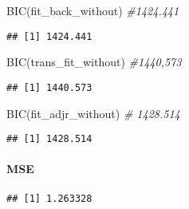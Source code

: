 \documentclass[
]{article}
\newenvironment{Shaded}{\begin{snugshade}}{\end{snugshade}}
\newcommand{\CommentTok}[1]{\textcolor[rgb]{0.56,0.35,0.01}{\textit{#1}}}
\newcommand{\DecValTok}[1]{\textcolor[rgb]{0.00,0.00,0.81}{#1}}
\newcommand{\FunctionTok}[1]{\textcolor[rgb]{0.00,0.00,0.00}{#1}}
\newcommand{\NormalTok}[1]{#1}
\newcommand{\OtherTok}[1]{\textcolor[rgb]{0.56,0.35,0.01}{#1}}
\newcommand{\SpecialCharTok}[1]{\textcolor[rgb]{0.00,0.00,0.00}{#1}}
\begin{document}
\begin{Shaded}
\begin{Highlighting}[]
\FunctionTok{BIC}\NormalTok{(fit\_back\_without) }\CommentTok{\#1424.441}
\end{Highlighting}
\end{Shaded}

\begin{verbatim}
## [1] 1424.441
\end{verbatim}

\begin{Shaded}
\begin{Highlighting}[]
\FunctionTok{BIC}\NormalTok{(trans\_fit\_without) }\CommentTok{\#1440,573}
\end{Highlighting}
\end{Shaded}

\begin{verbatim}
## [1] 1440.573
\end{verbatim}

\begin{Shaded}
\begin{Highlighting}[]
\FunctionTok{BIC}\NormalTok{(fit\_adjr\_without) }\CommentTok{\# 1428.514}
\end{Highlighting}
\end{Shaded}

\begin{verbatim}
## [1] 1428.514
\end{verbatim}

\hypertarget{mse}{%
\paragraph{MSE}\label{mse}}

\begin{Shaded}
\end{Shaded}

\begin{verbatim}
## [1] 1.263328
\end{verbatim}

\begin{Shaded}
\end{Shaded}
\end{document}

